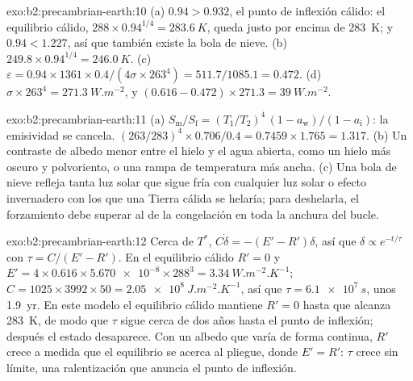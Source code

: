 \begin{solution}{exo:b2:precambrian-earth:10}
(a) $0.94 > 0.932$, el punto de inflexión cálido: el equilibrio cálido, $288\times0.94^{1/4} =
\qty{283.6}{K}$, queda justo por encima de \qty{283}{K}; y $0.94 < 1.227$, así que también existe la bola de nieve.
(b) $249.8\times0.94^{1/4} = \qty{246.0}{K}$. (c) $\varepsilon = 0.94\times1361\times0.4/(4\sigma
\times263^4) = 511.7/1085.1 = 0.472$. (d) $\sigma\times263^4 = \qty{271.3}{W.m^{-2}}$, y $(0.616
- 0.472)\times271.3 = \qty{39}{W.m^{-2}}$.
\end{solution}

\begin{solution}{exo:b2:precambrian-earth:11}
(a) $S_{\text{m}}/S_{\text{f}} = (T_1/T_2)^4\,(1 - a_{\text{w}})/(1 - a_{\text{i}})$: la
emisividad se cancela. $(263/283)^4\times0.706/0.4 = 0.7459\times1.765 = 1.317$. (b) Un contraste
de albedo menor entre el hielo y el agua abierta, como un hielo más oscuro y polvoriento, o una rampa de
temperatura más ancha. (c) Una bola de nieve refleja tanta luz solar que sigue fría con cualquier luz solar o
efecto invernadero con los que una Tierra cálida se helaría; para deshelarla, el forzamiento debe superar al de la
congelación en toda la anchura del bucle.
\end{solution}

\begin{solution}{exo:b2:precambrian-earth:12}
Cerca de $T^*$, $C\dot\delta = -(E' - R')\delta$, así que $\delta \propto e^{-t/\tau}$ con $\tau =
C/(E' - R')$. En el equilibrio cálido $R' = 0$ y $E' = 4\times0.616\times\num{5.670e-8}\times
288^3 = \qty{3.34}{W.m^{-2}.K^{-1}}$; $C = 1025\times3992\times50 = \qty{2.05e8}{J.m^{-2}.K^{-1}}$,
así que $\tau = \qty{6.1e7}{s}$, unos \qty{1.9}{yr}. En este modelo el equilibrio cálido mantiene $R' =
0$ hasta que alcanza \qty{283}{K}, de modo que $\tau$ sigue cerca de dos años hasta el punto de inflexión; después
el estado desaparece. Con un albedo que varía de forma continua, $R'$ crece a medida que el equilibrio se acerca al
pliegue, donde $E' = R'$: $\tau$ crece sin límite, una ralentización que anuncia el punto de
inflexión.
\end{solution}

